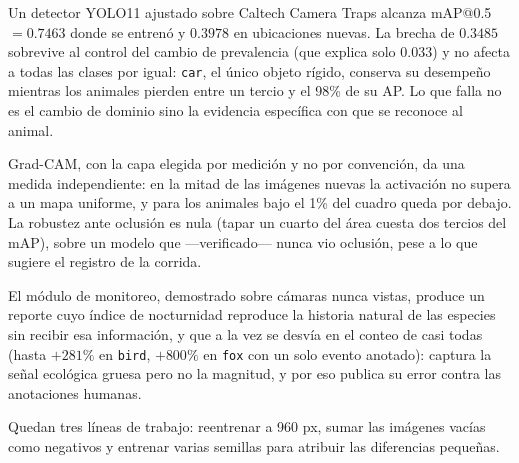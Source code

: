 Un detector YOLO11 ajustado sobre Caltech Camera Traps alcanza mAP@0.5
$= 0.7463$ donde se entrenó y $0.3978$ en ubicaciones nuevas. La brecha de
$0.3485$ sobrevive al control del cambio de prevalencia (que explica solo
$0.033$) y no afecta a todas las clases por igual: \texttt{car}, el único objeto
rígido, conserva su desempeño mientras los animales pierden entre un tercio y el
98\% de su AP. Lo que falla no es el cambio de dominio sino la evidencia
específica con que se reconoce al animal.

Grad-CAM, con la capa elegida por medición y no por convención, da una medida
independiente: en la mitad de las imágenes nuevas la activación no supera a un
mapa uniforme, y para los animales bajo el 1\% del cuadro queda por debajo. La
robustez ante oclusión es nula (tapar un cuarto del área cuesta dos tercios del
mAP), sobre un modelo que —verificado— nunca vio oclusión, pese a lo que sugiere
el registro de la corrida.

El módulo de monitoreo, demostrado sobre cámaras nunca vistas, produce un reporte
cuyo índice de nocturnidad reproduce la historia natural de las especies sin
recibir esa información, y que a la vez se desvía en el conteo de casi todas
(hasta $+281\%$ en \texttt{bird}, $+800\%$ en \texttt{fox} con un solo evento
anotado): captura la señal ecológica gruesa pero no la magnitud, y por eso
publica su error contra las anotaciones humanas.

Quedan tres líneas de trabajo: reentrenar a 960 px, sumar las imágenes vacías
como negativos y entrenar varias semillas para atribuir las diferencias pequeñas.
